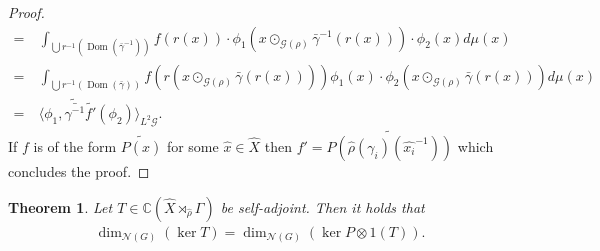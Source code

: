 \documentclass[12pt,a4paper]{scrartcl}
\theoremstyle{plain}
\newtheorem{Theorem}{Theorem}[section]
\theoremstyle{definition}
\numberwithin{equation}{section}
\newcommand{\C}{\mathbb{C}} %
\newcommand{\2}{\mathbb{Z} / 2 \mathbb{Z}}
\newcommand{\G}{\mathcal{G}}
\newcommand{\1}{\bar{1}}
\newcommand{\0}{\bar{0}}
\newcommand{\Dom}{\operatorname{Dom}}
\begin{document}
\begin{proof}
\begin{align*}
		=&~ \int_{\bigcup r^{-1}(\Dom(\bar{\gamma}^{-1}))} f(r(x)) \cdot \phi_1(x \odot_{\G (\rho)} \bar{\gamma}^{-1}(r(x))) \cdot \phi_2 (x) d \mu (x) \\
		=&~ \int_{\bigcup r^{-1}(\Dom(\bar{\gamma}))} f(r(x \odot_{\G (\rho)} \bar{\gamma}(r(x)))) \phi_1(x ) \cdot \phi_2 (x \odot_{\G (\rho)} \bar{\gamma}(r(x))) d \mu (x) \\
		=&~ \langle \phi_1 ,\tilde{\bar{\gamma^{-1}}} \tilde{f'} (\phi_2) \rangle_{L^2 \G}.
	\end{align*} 
	If $f$ is of the form $\widetilde{P(\hat{x})}$ for some $\hat{x} \in \hat{X}$ then $f' = \widetilde{P(\hat{\rho}(\gamma_i)(\hat{x_i}^{-1}))}$  which concludes the proof.
\end{proof}
\begin{Theorem} \label{pontr_vNd}
	Let $T \in \C(\hat{X} \rtimes_{\hat{\rho}} \Gamma)$ be self-adjoint. Then it holds that
	\begin{align*}
		\dim_{\mathcal{N}(G)}(\ker T) = \dim_{\mathcal{N}(G)}(\ker P \otimes 1(T)).
	\end{align*}
\end{Theorem} 
\end{document}
